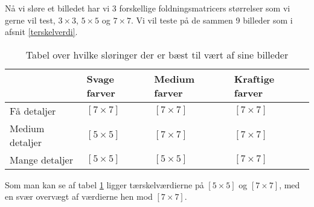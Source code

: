 Nå vi sløre et billedet har vi 3 forskellige foldningsmatricers størrelser som vi
gerne vil test, $3 \times 3$, $5 \times 5$ og $7 \times 7$. Vi vil teste
på de sammen 9 billeder som i afsnit \ref{terskelverdi}.

\begin{table}[!h]
    \centering
    \begin{tabular}{| l | l | l | l |} \hline
                            & Svage farver	& Medium farver	& Kraftige farver 	\\ \hline
        Få detaljer 		& $[7 \times 7]$	& $[7 \times 7]$	& $[7 \times 7]$		\\ \hline
        Medium detaljer 	& $[5 \times 5]$	& $[7 \times 7]$	& $[7 \times 7]$		\\ \hline
        Mange detaljer		& $[5 \times 5]$	& $[5 \times 5]$	& $[7 \times 7]$		\\ \hline
    \end{tabular}
    \caption{Tabel over hvilke sløringer der er bæst til vært af sine billeder}
    \label{sloringTabel}
\end{table}

Som man kan se af tabel \ref{sloringTabel} ligger tærskelværdierne på
$[5 \times 5]$ og $[7 \times 7]$, med en svær overvægt af værdierne hen
mod $[7 \times 7]$.
